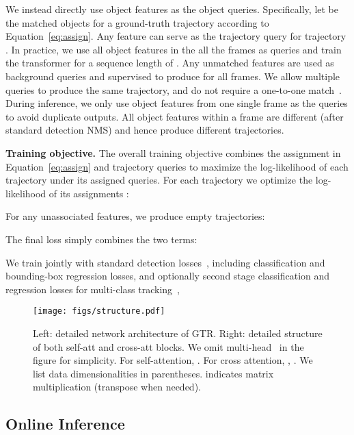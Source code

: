 \documentclass[10pt,twocolumn,letterpaper]{article}
\renewcommand{\paragraph}[1]{\noindent\textbf{#1}}
\let\oldsubsection\subsection
\renewcommand{\subsection}[1]{\vspace{-1mm}\oldsubsection{#1}\vspace{-1mm}}
\newcommand{\refeq}[1]{Equation~\eqref{eq:#1}}
\newcommand{\lblfig}[1]{\label{fig:#1}}
\newcommand{\lblsec}[1]{\label{sec:#1}}
\begin{document}
We instead directly use object features  as the object queries.
Specifically, let  be the matched objects for a ground-truth trajectory  according to \refeq{assign}.
Any feature  can serve as the trajectory query for trajectory .
In practice, we use all object features  in the all the  frames as queries and train the transformer for a sequence length of .
Any unmatched features  are used as background queries and supervised to produce  for all frames.
We allow multiple queries to produce the same trajectory, and do not require a one-to-one match~\cite{carion2020end}.
During inference, we only use object features from one single frame as the queries to avoid duplicate outputs.
All object features within a frame are different (after standard detection NMS) and hence produce different trajectories.


\paragraph{Training objective.}
The overall training objective combines the assignment in \refeq{assign} and trajectory queries to maximize the log-likelihood of each trajectory under its assigned queries.
For each trajectory  we optimize the log-likelihood of its assignments :

For any unassociated features, we produce empty trajectories:

The final loss simply combines the two terms:

We train  jointly with standard detection losses~\cite{zhou2019objects}, including classification and bounding-box regression losses, and 
optionally second stage classification and regression losses for multi-class tracking~\cite{dave2020tao}, 

\begin{figure*}[!t]
\centering
   \texttt{[image: figs/structure.pdf]}
   \vspace{-3mm}
   \caption{Left: detailed network architecture of GTR. Right: detailed structure of both self-att and cross-att blocks. We omit multi-head~\cite{vaswani2017attention} in the figure for simplicity. For self-attention, . For cross attention, , . We list data dimensionalities in parentheses.  indicates matrix multiplication (transpose when needed).}
\lblfig{structure}
\vspace{-5mm}
\end{figure*}



\subsection{Online Inference}
\lblsec{inference}
\end{document}
